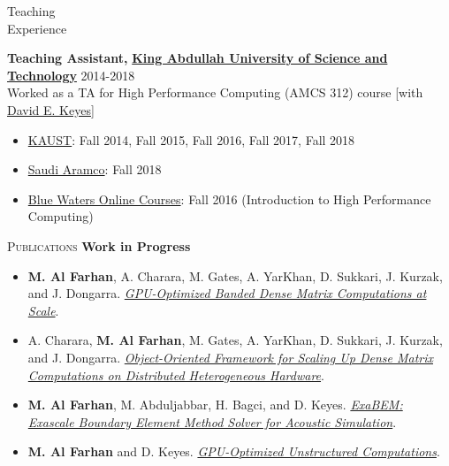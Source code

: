 \documentclass[10pt,a4paper]{article}
\begin{document}
\begin{cv}
\begin{cvlist}{}
\vspace{+2mm}
\item[{\parbox[t][0pt][t]{1in}{{\sc Teaching}\\ {\sc Experience}}}]
{\bf Teaching Assistant,}
{\href{https://www.kaust.edu.sa/en}
{\bf King Abdullah University of Science and Technology}} \hfill 2014-2018\\
Worked as a TA for High Performance Computing (AMCS 312) course [with
\href{https://www.kaust.edu.sa/en/study/faculty/david-keyes}{David E. Keyes}]
\vspace{-2mm}
\begin{itemize}[label=\raisebox{0.25ex}{\tiny$\bullet$},nosep, leftmargin=*]
\item
\href{https://www.kaust.edu.sa/en}{KAUST}:
Fall 2014, Fall 2015, Fall 2016, Fall 2017, Fall 2018
\item
\href{https://www.saudiaramco.com/}{Saudi Aramco}: Fall 2018
\item
\href{https://bluewaters.ncsa.illinois.edu/training}{Blue Waters Online Courses}:
Fall 2016 (Introduction to High Performance Computing)
\end{itemize}


\vspace{+2mm}
\item[\textsc{Publications}]
{\bf Work in Progress}
\vspace{-2mm}
\begin{itemize}[label=\raisebox{0.25ex}{\tiny$\bullet$},nosep, leftmargin=*]
\item
\textbf{M. Al Farhan},
A. Charara, M. Gates, A. YarKhan, D. Sukkari, J. Kurzak, and J. Dongarra.
\href{}
{\textit{GPU-Optimized Banded Dense Matrix Computations at Scale}}.
\item
A. Charara, \textbf{M. Al Farhan},
M. Gates, A. YarKhan, D. Sukkari, J. Kurzak, and J. Dongarra.
\href{}
{\textit{Object-Oriented Framework
for Scaling Up Dense Matrix
Computations on Distributed Heterogeneous Hardware}}.
\item
\textbf{M. Al Farhan}, M. Abduljabbar,
H. Bagci, and D. Keyes.
\href{}
{\textit{ExaBEM: Exascale Boundary Element Method Solver for Acoustic Simulation}}.
\item
\textbf{M. Al Farhan} and D. Keyes.
\href{}
{\textit{GPU-Optimized Unstructured Computations}}.
\end{itemize}


\end{cvlist}
\end{cv}
\end{document}
